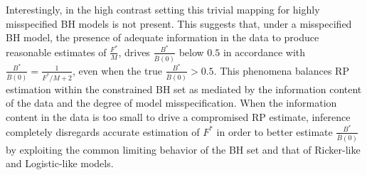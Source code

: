 \documentclass[12pt]{article}
\begin{document}
%
Interestingly, in the high contrast setting this trivial mapping for highly 
misspecified BH models is not present. This suggests that, under a 
misspecified BH model, the presence of adequate information in the data to 
produce reasonable estimates of $\frac{F^*}{M}$, drives $\frac{B^*}{\bar B(0)}$ 
below $0.5$ in accordance with $\frac{B^*}{\bar B(0)}=\frac{1}{F^*/M+2}$, 
even when the true $\frac{B^*}{\bar B(0)}>0.5$. 
This phenomena balances RP estimation within the constrained BH set as 
mediated by the information content of the data and the degree of model 
misspecification. When the information content in the data is too small to 
drive a compromised RP estimate, inference completely disregards accurate 
estimation of $F^*$ in order to better estimate $\frac{B^*}{\bar B(0)}$ 
by exploiting the common limiting behavior of the BH set and that of 
Ricker-like and Logistic-like models. 


%
%
%
%
%
\end{document}
